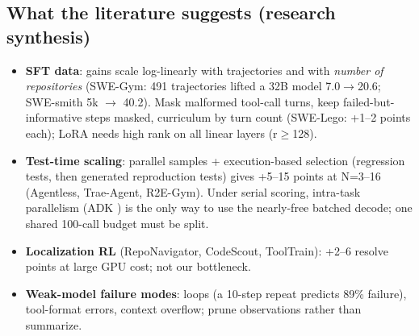 \subsection{What the literature suggests (research synthesis)}
\begin{itemize}
\item \textbf{SFT data}: gains scale log-linearly with trajectories and with \emph{number of repositories} (SWE-Gym: 491 trajectories
lifted a 32B model 7.0$\to$20.6; SWE-smith 5k $\to$ 40.2). Mask malformed tool-call turns, keep failed-but-informative steps masked,
curriculum by turn count (SWE-Lego: +1--2 points each); LoRA needs high rank on all linear layers (r$\geq$128).
\item \textbf{Test-time scaling}: parallel samples + execution-based selection (regression tests, then generated reproduction tests)
gives +5--15 points at N=3--16 (Agentless, Trae-Agent, R2E-Gym). Under serial scoring, intra-task parallelism (ADK
) is the only way to use the nearly-free batched decode; one shared 100-call budget must be split.
\item \textbf{Localization RL} (RepoNavigator, CodeScout, ToolTrain): +2--6 resolve points at large GPU cost; not our bottleneck.
\item \textbf{Weak-model failure modes}: loops (a 10-step repeat predicts 89\% failure), tool-format errors, context overflow; prune
observations rather than summarize.
\end{itemize}

